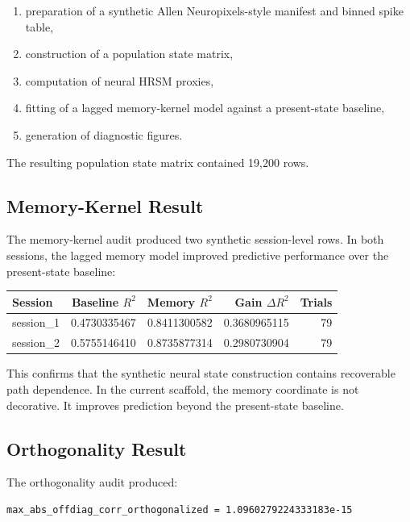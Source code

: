 \begin{enumerate}
    \item preparation of a synthetic Allen Neuropixels-style manifest and binned spike table,
    \item construction of a population state matrix,
    \item computation of neural HRSM proxies,
    \item fitting of a lagged memory-kernel model against a present-state baseline,
    \item generation of diagnostic figures.
\end{enumerate}

The resulting population state matrix contained 19,200 rows.

\subsection{Memory-Kernel Result}

The memory-kernel audit produced two synthetic session-level rows. In both sessions, the lagged memory model improved predictive performance over the present-state baseline:

\begin{center}
\begin{tabular}{lrrrr}
\hline
Session & Baseline $R^2$ & Memory $R^2$ & Gain $\Delta R^2$ & Trials \\
\hline
session\_1 & 0.4730335467 & 0.8411300582 & 0.3680965115 & 79 \\
session\_2 & 0.5755146410 & 0.8735877314 & 0.2980730904 & 79 \\
\hline
\end{tabular}
\end{center}

This confirms that the synthetic neural state construction contains recoverable path dependence. In the current scaffold, the memory coordinate is not decorative. It improves prediction beyond the present-state baseline.

\subsection{Orthogonality Result}

The orthogonality audit produced:

\begin{verbatim}
max_abs_offdiag_corr_orthogonalized = 1.0960279224333183e-15
\end{verbatim}

